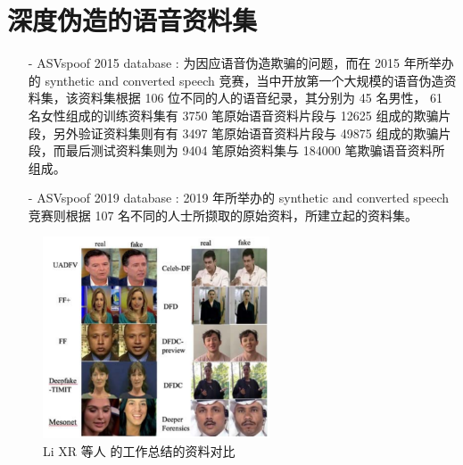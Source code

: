 \section{深度伪造的语音资料集}

\begin{itemize}
\item [-] ASVspoof 2015 database \cite{list1071}: 为因应语音伪造欺骗的问题，而在 2015 年所举办的 synthetic and converted speech 竞赛，当中开放第一个大规模的语音伪造资料集，该资料集根据 106 位不同的人的语音纪录，其分别为 45 名男性， 61 名女性组成的训练资料集有 3750 笔原始语音资料片段与 12625 组成的欺骗片段，另外验证资料集则有有 3497 笔原始语音资料片段与 49875 组成的欺骗片段，而最后测试资料集则为 9404 笔原始资料集与 184000 笔欺骗语音资料所组成。

\item [-] ASVspoof 2019 database \cite{list1072}: 2019 年所举办的 synthetic and converted speech 竞赛则根据 107 名不同的人士所撷取的原始资料，所建立起的资料集。
\end{itemize}

\begin{figure}[htb]
\centering 
\includegraphics[width=0.60\textwidth]{img/ch2m1.png} 
\caption{Li XR 等人 \cite{2021496} 的工作总结的资料对比}
\label{Test}
\end{figure}
